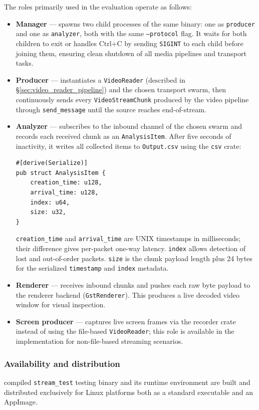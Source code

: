 The roles primarily used in the evaluation operate as follows:
\begin{itemize}
    \item \textbf{Manager} --- spawns two child processes of the same binary: one as \texttt{producer} and one as \texttt{analyzer}, both with the same \texttt{--protocol} flag. It waits for both children to exit or handles Ctrl+C by sending \texttt{SIGINT} to each child before joining them, ensuring clean shutdown of all media pipelines and transport tasks.
    \item \textbf{Producer} --- instantiates a \texttt{VideoReader} (described in \S\ref{sec:video_reader_pipeline}) and the chosen transport swarm, then continuously sends every \texttt{VideoStreamChunk} produced by the video pipeline through \texttt{send\_message} until the source reaches end-of-stream.
    \item \textbf{Analyzer} --- subscribes to the inbound channel of the chosen swarm and records each received chunk as an \texttt{AnalysisItem}. After five seconds of inactivity, it writes all collected items to \texttt{Output.csv} using the \texttt{csv} crate:
\begin{Verbatim}[samepage=true]
#[derive(Serialize)]
pub struct AnalysisItem {
    creation_time: u128,
    arrival_time: u128,
    index: u64,
    size: u32,
}
\end{Verbatim}
    \texttt{creation\_time} and \texttt{arrival\_time} are UNIX timestamps in milliseconds; their difference gives per-packet one-way latency. \texttt{index} allows detection of lost and out-of-order packets. \texttt{size} is the chunk payload length plus 24 bytes for the serialized \texttt{timestamp} and \texttt{index} metadata.
    \item \textbf{Renderer} --- receives inbound chunks and pushes each raw byte payload to the renderer backend (\texttt{GstRenderer}). This produces a live decoded video window for visual inspection.
    \item \textbf{Screen producer} --- captures live screen frames via the recorder crate instead of using the file-based \texttt{VideoReader}; this role is available in the implementation for non-file-based streaming scenarios.
\end{itemize}

\subsubsection{Availability and distribution}
\label{sec:availability_distribution}
compiled \texttt{stream\_test} testing binary and its runtime environment are built and distributed exclusively for Linux platforms both as a standard executable and an AppImage. 

